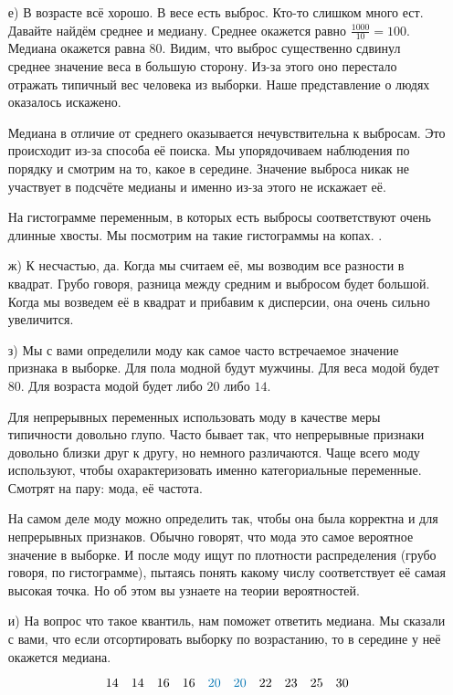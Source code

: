 \documentclass[12pt, a4paper, oneside]{article}
\begin{document}
{\begin{enumerate}
	\item[е)] 	В возрасте всё хорошо. В весе есть выброс. Кто-то слишком много ест. Давайте найдём среднее и медиану. Среднее окажется равно $\frac{1000}{10} = 100$. Медиана окажется равна $80$. Видим, что выброс существенно сдвинул среднее значение веса в большую сторону. Из-за этого оно перестало отражать типичный вес человека из выборки. Наше представление о людях оказалось искажено. 

	Медиана в отличие от среднего оказывается нечувствительна к выбросам. Это происходит из-за способа её поиска. Мы упорядочиваем наблюдения по порядку и смотрим на то, какое в середине. Значение выброса никак не участвует в подсчёте медианы и именно из-за этого не искажает её. 
	
	На гистограмме переменным, в которых есть выбросы соответствуют очень длинные хвосты. Мы посмотрим на такие гистограммы на копах. 	
	. 
	\item[ж)]  К несчастью, да.  Когда мы считаем её, мы возводим все разности в квадрат. Грубо говоря, разница между средним и выбросом будет большой. Когда мы возведем её в квадрат и прибавим к дисперсии, она очень сильно увеличится. 
	
	\item[з)] Мы с вами определили моду как самое часто встречаемое значение признака в выборке. Для пола модной будут мужчины. Для веса модой будет $80$. Для возраста модой будет либо $20$ либо $14$.  
	
	Для непрерывных переменных использовать моду в качестве меры типичности довольно глупо. Часто бывает так, что непрерывные признаки довольно близки друг к другу, но немного различаются. Чаще всего моду используют, чтобы охарактеризовать именно категориальные переменные. Смотрят на пару: мода, её частота. 
	
	На самом деле моду можно определить так, чтобы она была корректна и для непрерывных признаков. Обычно говорят, что мода это самое вероятное значение в выборке. И после моду ищут по плотности распределения (грубо говоря, по гистограмме), пытаясь понять какому числу соответствует её самая высокая точка. Но об этом вы узнаете на теории вероятностей. 
	
	\item[и)]  На вопрос что такое квантиль, нам поможет ответить медиана. Мы сказали с вами, что если отсортировать выборку по возрастанию, то в середине у неё окажется медиана. 
	
	\[
	14 \quad 14  \quad 16  \quad 16  \quad {\color{myblue}{20}}  \quad {\color{myblue}{20}}  \quad 22  \quad 23  \quad 25  \quad 30
	\]
	

\end{enumerate}}
\end{document}
